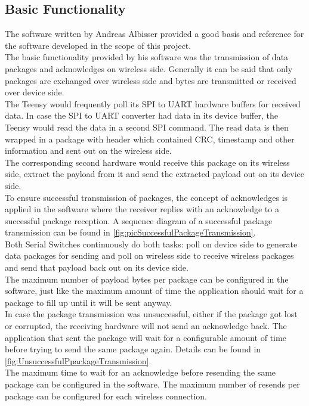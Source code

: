 \subsection{Basic Functionality}
The software written by Andreas Albisser provided a good basis and reference for the software developed in the scope of this project.\\
The basic functionality provided by his software was the transmission of data packages and acknowledges on wireless side. Generally it can be said that only packages are exchanged over wireless side and bytes are transmitted or received over device side. \\
The Teensy would frequently poll its SPI to UART hardware buffers for received data. In case the SPI to UART converter had data in its device buffer, the Teensy would read the data in a second SPI command. The read data is then wrapped in a package with header which contained CRC, timestamp and other information and sent out on the wireless side.\\
The corresponding second hardware would receive this package on its wireless side, extract the payload from it and send the extracted payload out on its device side. \\
To ensure successful transmission of packages, the concept of acknowledges is applied in the software where the receiver replies with an acknowledge to a successful package reception. A sequence diagram of a successful package transmission can be found in \autoref{fig:picSuccessfulPackageTransmission}.\\
Both Serial Switches continuously do both tasks: poll on device side to generate data packages for sending and poll on wireless side to receive wireless packages and send that payload back out on its device side.\\ 
%
The maximum number of payload bytes per package can be configured in the software, just like the maximum amount of time the application should wait for a package to fill up until it will be sent anyway.\\
In case the package transmission was unsuccessful, either if the package got lost or corrupted, the receiving hardware will not send an acknowledge back. The application that sent the package will wait for a configurable amount of time before trying to send the same package again. Details can be found in \autoref{fig:UnsuccessfulPpackageTransmission}.\\
The maximum time to wait for an acknowledge before resending the same package can be configured in the software. The maximum number of resends per package can be configured for each wireless connection. \\
%
%
